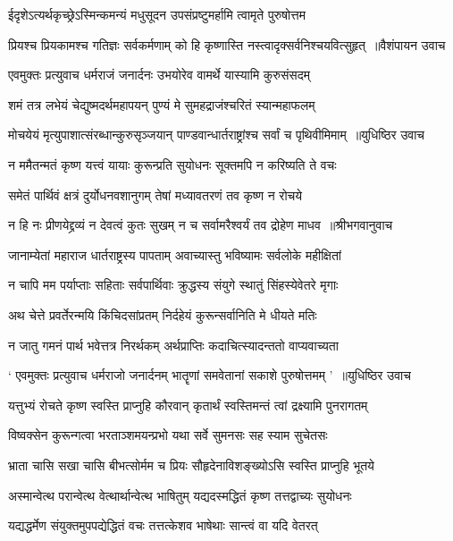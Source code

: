 \twolineshloka
{ईदृशेऽत्यर्थकृच्छ्रेऽस्मिन्कमन्यं मधुसूदन}
{उपसंप्रष्टुमर्हामि त्वामृते पुरुषोत्तम}


\threelineshloka
{प्रियश्च प्रियकामश्च गतिज्ञः सर्वकर्मणाम्}
{को हि कृष्णास्ति नस्त्वादृक्सर्वनिश्चयवित्सुहृत् ॥वैशंपायन उवाच}
{}


\twolineshloka
{एवमुक्तः प्रत्युवाच धर्मराजं जनार्दनः}
{उभयोरेव वामर्थे यास्यामि कुरुसंसदम्}


\twolineshloka
{शमं तत्र लभेयं चेद्युष्मदर्थमहापयन्}
{पुण्यं मे सुमहद्राजंश्चरितं स्यान्महाफलम्}


\threelineshloka
{मोचयेयं मृत्युपाशात्संरब्धान्कुरुसृञ्जयान्}
{पाण्डवान्धार्तराष्ट्रांश्च सर्वां च पृथिवीमिमाम् ॥युधिष्ठिर उवाच}
{}


\twolineshloka
{न ममैतन्मतं कृष्ण यत्त्वं यायाः कुरून्प्रति}
{सुयोधनः सूक्तमपि न करिष्यति ते वचः}


\twolineshloka
{समेतं पार्थिवं क्षत्रं दुर्योधनवशानुगम्}
{तेषां मध्यावतरणं तव कृष्ण न रोचये}


\threelineshloka
{न हि नः प्रीणयेद्द्रव्यं न देवत्वं कुतः सुखम्}
{न च सर्वामरैश्वर्यं तव द्रोहेण माधव ॥श्रीभगवानुवाच}
{}


\twolineshloka
{जानाम्येतां महाराज धार्तराष्ट्रस्य पापताम्}
{अवाच्यास्तु भविष्यामः सर्वलोके महीक्षितां}


\threelineshloka
{न चापि मम पर्याप्ताः सहिताः सर्वपार्थिवाः}
{क्रुद्धस्य संयुगे स्थातुं सिंहस्येवेतरे मृगाः}
{}


\twolineshloka
{अथ चेत्ते प्रवर्तेरन्मयि किंचिदसांप्रतम्}
{निर्दहेयं कुरून्सर्वानिति मे धीयते मतिः}


\twolineshloka
{न जातु गमनं पार्थ भवेत्तत्र निरर्थकम्}
{अर्थप्राप्तिः कदाचित्स्यादन्ततो वाप्यवाच्यता}


\threelineshloka
{` एवमुक्तः प्रत्युवाच धर्मराजो जनार्दनम्}
{भातॄणां समवेतानां सकाशे पुरुषोत्तमम् ' ॥युधिष्ठिर उवाच}
{}


\twolineshloka
{यत्तुभ्यं रोचते कृष्ण स्वस्ति प्राप्नुहि कौरवान्}
{कृतार्थं स्वस्तिमन्तं त्वां द्रक्ष्यामि पुनरागतम्}


\twolineshloka
{विष्वक्सेन कुरून्गत्वा भरताञ्शमयन्प्रभो}
{यथा सर्वे सुमनसः सह स्याम सुचेतसः}


\twolineshloka
{भ्राता चासि सखा चासि बीभत्सोर्मम च प्रियः}
{सौहृदेनाविशङ्ख्योऽसि स्वस्ति प्राप्नुहि भूतये}


\twolineshloka
{अस्मान्वेत्थ परान्वेत्थ वेत्थार्थान्वेत्थ भाषितुम्}
{यद्यदस्मद्धितं कृष्ण तत्तद्वाच्यः सुयोधनः}


\twolineshloka
{यद्यद्धर्मेण संयुक्तमुपपद्येद्धितं वचः}
{तत्तत्केशव भाषेथाः सान्त्वं वा यदि वेतरत्}


